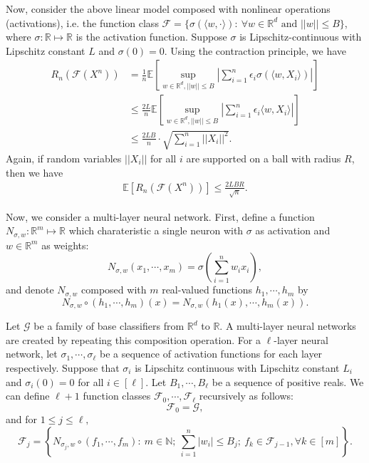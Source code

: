 \documentclass[12pt]{llncs}
\newcommand{\E}[1]{\mathbb{E}\left[#1\right]}
\newcommand{\F}{\mathcal{F}}
\newcommand{\reals}{\mathbb{R}}
\begin{document}
Now, consider the above linear model composed with nonlinear operations (activations), i.e. the function class $\F = \{\sigma(\langle w, \cdot \rangle) :\ \forall w \in \reals^d\text{ and }||w|| \leq B\}$, where $\sigma : \reals \mapsto \reals$ is the activation function. Suppose $\sigma$ is Lipschitz-continuous with Lipschitz constant $L$ and $\sigma(0) = 0$. Using the contraction principle, we have
\begin{align*}
  R_n(\F(X^n)) &= \frac{1}{n}\E{\sup\limits_{w \in \reals^d, ||w|| \leq B} \left| \sum_{i=1}^{n} \epsilon_i \sigma(\langle w, X_i \rangle) \right|}\\ &\leq \frac{2L}{n}\E{\sup\limits_{w \in \reals^d, ||w|| \leq B} \left| \sum_{i=1}^{n} \epsilon_i \langle w, X_i \rangle \right|}\\ &\leq \frac{2LB}{n} \cdot \sqrt{\sum_{i=1}^{n} \left|\left| X_i \right|\right|^2}.
\end{align*}
Again, if random variables $||X_i||$ for all $i$ are supported on a ball with radius $R$, then we have
\begin{align}
  \E{R_n(\F(X^n))} \leq \frac{2LBR}{\sqrt{n}}.
\end{align}

Now, we consider a multi-layer neural network. First, define a function $N_{\sigma, w}: \reals^m \mapsto \reals$ which charateristic a single neuron with $\sigma$ as activation and $w \in \reals^m$ as weights: $$N_{\sigma, w}(x_1, \cdots, x_m) = \sigma(\sum_{i=1}^{n}w_i x_i),$$ and denote $N_{\sigma, w}$ composed with $m$ real-valued functions $h_1, \cdots, h_m$ by $$N_{\sigma, w} \circ (h_1, \cdots, h_m)(x) = N_{\sigma, w}(h_1(x), \cdots, h_m(x)).$$

Let $\mathcal{G}$ be a family of base classifiers from $\reals^d$ to $\reals$. A multi-layer neural networks are created by repeating this composition operation. For a $\ell$-layer neural network, let $\sigma_1, \cdots, \sigma_\ell$ be a sequence of activation functions for each layer respectively. Suppose that $\sigma_i$ is Lipschitz continuous with Lipschitz constant $L_i$ and $\sigma_i(0) = 0$ for all $i \in [\ell]$. Let $B_1, \cdots, B_\ell$ be a sequence of positive reals. We can define $\ell+1$ function classes $\F_0, \cdots, \F_\ell$ recursively as follows: $$\F_0 = \mathcal{G},$$ and for $1 \leq j \leq \ell,$ $$\F_j = \left\{N_{\sigma_j, w} \circ (f_1, \cdots, f_m) :\ m \in \mathbb{N};\ \sum_{i=1}^{n} |w_i| \leq B_j;\ f_k \in \F_{j-1}, \forall k \in [m]\right\}.$$
\end{document}

